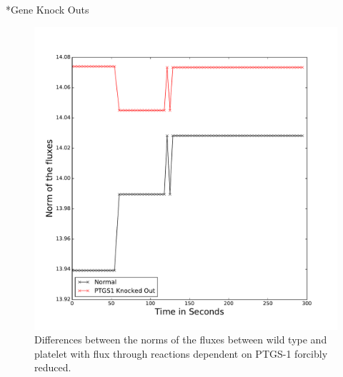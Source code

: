 \documentclass[11pt]{article}
\makeatletter
\renewcommand\subsection{\@startsection
	{subsection}{2}{0mm}
	{-0.05in}
	{-0.5\baselineskip}
	{\normalfont\normalsize\bfseries}}
\makeatother
\begin{document}
\subsection*{Gene Knock Outs}
\begin{figure}
\vspace{-.5cm}
\centering
\includegraphics[scale=.35]{../figures/NormOfFluxesNormalAndKnockedCaSpike}
\caption{Differences between the norms of the fluxes between wild type and platelet with flux through reactions dependent on PTGS-1 forcibly reduced.}
\label{fig:normfluxes}
\end{figure}
\end{document}
